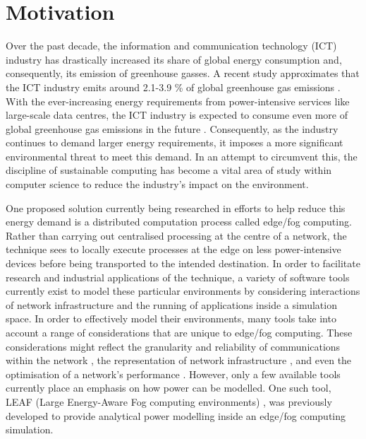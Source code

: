\documentclass{l4proj}
\begin{document}

\section{Motivation}\label{intro:subsec:motivation}
Over the past decade, the information and communication technology (ICT) industry has drastically increased its share of global energy consumption and, consequently, its emission of greenhouse gasses.
A recent study approximates that the ICT industry emits around 2.1-3.9 \% of global greenhouse gas emissions \citep{current_energy_consumption}.
With the ever-increasing energy requirements from power-intensive services like large-scale data centres, the ICT industry is expected to consume even more of global greenhouse gas emissions in the future \citep{co2Challenges}.
Consequently, as the industry continues to demand larger energy requirements, it imposes a more significant environmental threat to meet this demand.
In an attempt to circumvent this, the discipline of sustainable computing has become a vital area of study within computer science to reduce the industry's impact on the environment.

One proposed solution currently being researched in efforts to help reduce this energy demand is a distributed computation process called edge/fog computing.
Rather than carrying out centralised processing at the centre of a network, the technique sees to locally execute processes at the edge on less power-intensive devices before being transported to the intended destination.
In order to facilitate research and industrial applications of the technique, a variety of software tools currently exist to model these particular environments by considering interactions of network infrastructure and the running of applications inside a simulation space.
In order to effectively model their environments, many tools take into account a range of considerations that are unique to edge/fog computing.
These considerations might reflect the granularity and reliability of communications within the network \citep{FogNetSim}, the representation of network infrastructure \citep{ENIGMA}, and even the optimisation of a network's performance \citep{EdgeCloudSim}.
However, only a few available tools currently place an emphasis on how power can be modelled.
One such tool, LEAF (Large Energy-Aware Fog computing environments) \citep{leaf2021}, was previously developed to provide analytical power modelling inside an edge/fog computing simulation.
\end{document}
